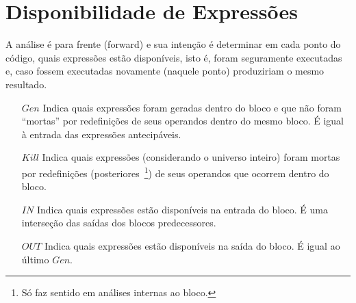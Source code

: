 \section{Disponibilidade de Express\~oes}

A an\'alise \'e para frente (\textsf{forward}) e sua inten\c{c}\~ao \'e determinar em cada ponto do c\'odigo, quais express\~oes est\~ao dispon\'iveis, isto \'e, foram seguramente executadas e, caso fossem executadas novamente (naquele ponto) produziriam o mesmo resultado.
\begin{itemize}
  \item[$Gen$] Indica quais express\~oes foram geradas dentro do bloco e que n\~ao foram ``mortas'' por redefini\c{c}\~oes de seus operandos dentro do mesmo bloco. {\color{red} \'E igual \`a entrada das express\~oes antecip\'aveis}.
  \item[$Kill$] Indica quais express\~oes (considerando o universo inteiro) foram mortas por redefini\c{c}\~oes (posteriores~\footnote{S\'o faz sentido em an\'alises internas ao bloco.}) de seus operandos que ocorrem dentro do bloco.
  \item[$IN$] Indica quais express\~oes est\~ao dispon\'iveis na entrada do bloco. \'E uma interse\c{c}\~ao das sa\'idas dos blocos predecessores.
  \item[$OUT$] Indica quais express\~oes est\~ao dispon\'iveis na sa\'ida do bloco. {\color{red} \'E igual ao \'ultimo $Gen$}.
\end{itemize}



